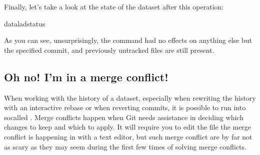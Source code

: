 \sphinxAtStartPar
Finally, let’s take a look at the state of the dataset after this operation:

\begin{sphinxVerbatim}[commandchars=\\\{\}]
dataladstatus
\end{sphinxVerbatim}

\sphinxAtStartPar
As you can see, unsurprisingly, the  command had no
effects on anything else but the specified commit, and previously untracked
files are still present.

\ignorespaces 

\subsection{Oh no! I’m in a merge conflict!}
\label{\detokenize{basics/101-137-history:oh-no-i-m-in-a-merge-conflict}}\label{\detokenize{basics/101-137-history:index-7}}
\sphinxAtStartPar
When working with the history of a dataset, especially when rewriting
the history with an interactive rebase or when reverting commits, it is
possible to run into so\sphinxhyphen{}called .
Merge conflicts happen when Git needs assistance in deciding
which changes to keep and which to apply. It will require
you to edit the file the merge conflict is happening in with
a text editor, but such merge conflict are by far not as scary as
they may seem during the first few times of solving merge conflicts.

